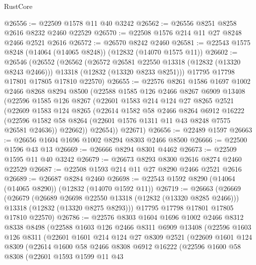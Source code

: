 \begin{lexlean}{RustCore}
\begin{coremodule}
@26556 := @22509 @1578 @11 @40 @3242
@26562 := @26556 @8251 @8258 @2616 @8232 @2460 @22529
@26570 := @22508 @1576 @214 @11 @27 @8248 @2466 @2521 @2616
@26572 := @26570 @8242 @2460
@26581 := @22543 @1575 @8248 (@14064 (@14065 @8248)) (@12832 (@14070 @1575 @11))
@26602 := @26546
    (@26552
      (@26562
        (@26572 @26581 @22550 @13318 (@12832 (@13320 @8243 @2466)))
        @13318
        (@12832 (@13320 @8233 @8251)))
      @17795
      @17798
      @17801
      @17805
      @17810
      @22570)
@26655 := @22576
    @8261
    @1586
    @1697
    @1002
    @2466
    @8268
    @8294
    @8500
    (@22588
      @1585
      @126
      @2466
      @8267
      @6909
      @13408
      (@22596
        @1585
        @126
        @8267
        (@22601
          @1583
          @214
          @124
          @27
          @8265
          @2521
          (@22609
            @1583
            @124
            @8265
            (@22614
              @1582
              @58
              @2466
              @8264
              @6912
              @16222
              (@22596 @1582 @58 @8264 (@22601 @1576 @1311 @11 @43 @8248 @7575 @26581 @24636))
              @22662))
          @22654))
      @22671)
@26656 := @22489 @1597
@26663 := @26656 @1604 @1696 @1002 @8294 @8303 @2466 @8500
@26666 := @22500 @1596 @43 @13
@26669 := @26666 @8294 @8301 @4462
@26673 := @22509 @1595 @11 @40 @3242
@26679 := @26673 @8293 @8300 @2616 @8274 @2460 @22529
@26687 := @22508 @1593 @214 @11 @27 @8290 @2466 @2521 @2616
@26689 := @26687 @8284 @2460
@26698 := @22543 @1592 @8290 (@14064 (@14065 @8290)) (@12832 (@14070 @1592 @11))
@26719 := @26663
    (@26669
      (@26679
        (@26689 @26698 @22550 @13318 (@12832 (@13320 @8285 @2466)))
        @13318
        (@12832 (@13320 @8275 @8293)))
      @17795
      @17798
      @17801
      @17805
      @17810
      @22570)
@26786 := @22576
    @8303
    @1604
    @1696
    @1002
    @2466
    @8312
    @8338
    @8498
    (@22588
      @1603
      @126
      @2466
      @8311
      @6909
      @13408
      (@22596
        @1603
        @126
        @8311
        (@22601
          @1601
          @214
          @124
          @27
          @8309
          @2521
          (@22609
            @1601
            @124
            @8309
            (@22614
              @1600
              @58
              @2466
              @8308
              @6912
              @16222
              (@22596
                @1600
                @58
                @8308
                (@22601
                  @1593
                  @1599
                  @11
                  @43

\end{coremodule}
\end{lexlean}
